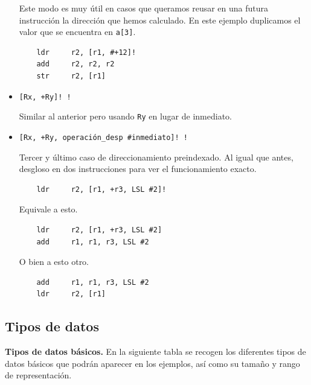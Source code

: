 \begin{descript}
\begin{itemize}
    Este modo es muy útil en casos que queramos reusar en una futura instrucción
    la dirección que hemos calculado. En este ejemplo duplicamos el valor
    que se encuentra en {\tt a[3]}.

\begin{lstlisting}
    ldr     r2, [r1, #+12]!
    add     r2, r2, r2
    str     r2, [r1]
\end{lstlisting}

  \item{\tt [Rx, +Ry]! \newline
            [Rx, -Ry]! \newline}

    Similar al anterior pero usando {\tt Ry} en lugar de inmediato.

  \item{\tt [Rx, +Ry, operación\_desp \#inmediato]! ! \newline}

    Tercer y último caso de direccionamiento preindexado. Al igual que
    antes, desgloso en dos instrucciones para ver el funcionamiento exacto.

\begin{lstlisting}
    ldr     r2, [r1, +r3, LSL #2]!
\end{lstlisting}

    Equivale a esto.

\begin{lstlisting}
    ldr     r2, [r1, +r3, LSL #2]
    add     r1, r1, r3, LSL #2
\end{lstlisting}

    O bien a esto otro.

\begin{lstlisting}
    add     r1, r1, r3, LSL #2
    ldr     r2, [r1]
\end{lstlisting}
\end{itemize}


\subsection{Tipos de datos}

\vspace{0.25cm}
{\bf Tipos de datos básicos.} En la siguiente tabla se recogen los diferentes tipos de datos básicos
 que podrán aparecer en los ejemplos, así como su tamaño y  rango de
representación.


\end{descript}
